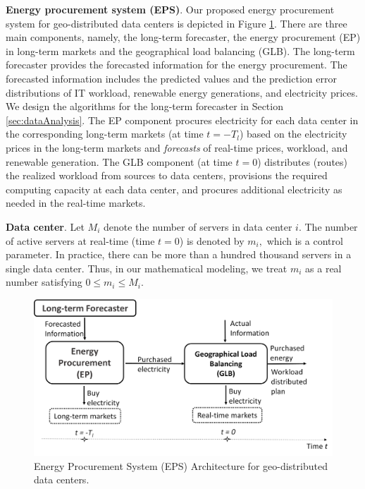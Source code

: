 \textbf{Energy procurement system (EPS)}. Our proposed energy
procurement system for geo-distributed data centers is depicted in
Figure \ref{fig:SystemArchitecture}. There are three main components,
namely, the long-term forecaster, the energy procurement
(EP) in long-term markets and the geographical load balancing (GLB). The long-term forecaster provides the forecasted
information for the energy procurement. The forecasted information
includes the predicted values and the prediction error distributions
of IT workload, renewable energy generations, and electricity
prices. We design the algorithms for the long-term forecaster in
Section \ref{sec:dataAnalysis}. The EP component procures electricity
for each data center in the corresponding long-term markets (at time
$t = -T_l$) based on the electricity prices in the long-term markets
and \emph{forecasts} of real-time prices, workload, and renewable
generation. The GLB component (at time $t = 0$) distributes (routes)
the realized workload from sources to data centers, provisions the
required computing capacity at each data center, and procures
additional electricity as needed in the real-time markets.

\textbf{Data center}. Let $M_i$ denote the number of servers in data
center $i$. The number of active servers at real-time (time $t=0$) is
denoted by $m_i,$ which is a control parameter. In practice, there can
be more than a hundred thousand servers in a single data center. Thus,
in our mathematical modeling, we treat $m_i$ as a real number
satisfying $0 \leq m_i \leq M_i.$

\begin{figure}[!t]
	\centering
	\includegraphics[width=1.0\linewidth]{figs/SystemArchitecture}
	\vspace{-0.8cm}
	\caption{Energy Procurement System (EPS) Architecture for geo-distributed data centers.}
	\label{fig:SystemArchitecture}
	\vspace{-0.3cm}
\end{figure}

